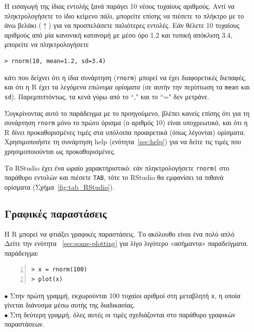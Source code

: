 \documentclass[a4paper,10pt,twocolumn]{article}
\makeatletter
\let\SF@@footnote\footnote
\def\footnote{\ifx\protect\@typeset@protect
 \expandafter\SF@@footnote
 \else
 \expandafter\SF@gobble@opt
 \fi
}
\edef\SF@gobble@opt{\noexpand\protect
 \expandafter\noexpand\csname SF@gobble@opt \endcsname}
\makeatother
\begin{document}
Η εισαγωγή της ίδιας εντολής ξανά παράγει 10 νέους τυχαίους αριθμούς. Αντί να πληκτρολογήσετε το ίδιο κείμενο 
πάλι, μπορείτε επίσης να πιέσετε το πλήκτρο με το άνω βελάκι ($\uparrow$) για να προσπελάσετε παλιότερες 
εντολές. Εάν θέλετε 10 τυχαίους αριθμούς από μία κανονική κατανομή με μέσο όρο 1.2 και τυπική απόκλιση 3.4,
μπορείτε να πληκτρολογήσετε

\begin{Verbatim}[frame=single,gobble=0]
> rnorm(10, mean=1.2, sd=3.4)
\end{Verbatim}

κάτι που δείχνει ότι η ίδια συνάρτηση (\texttt{rnorm}) μπορεί να έχει διαφορετικές διεπαφές, και ότι η R έχει
τα λεγόμενα \emph{επώνυμα ορίσματα}  (σε αυτήν την περίπτωση τα \texttt{mean} και \texttt{sd}). Παρεμπιπτόντως,
τα κενά γύρω από το ``," και το ``=" δεν μετράνε.

Συγκρίνοντας αυτό το παράδειγμα με το προηγούμενο, βλέπει κανείς επίσης ότι για τη συνάρτηση \texttt{rnorm}
μόνο το πρώτο όρισμα (ο αριθμός 10) είναι υποχρεωτικό, και ότι η R δίνει προκαθορισμένες τιμές στα υπόλοιπα
προαιρετικά (όπως λέγονται) ορίσματα.\footnote{Χρησιμοποιήστε τη συνάρτηση help (ενότητα~\ref{sec:help}) για να
δείτε τις τιμές που χρησιμοποιούνται ως προκαθορισμένες.} 

Το RStudio έχει ένα ωραίο χαρακτηριστικό: εάν πληκτρολογήσετε \verb!rnorm(! στο παράθυρο εντολών και πιέσετε
\texttt{TAB}, τότε το RStudio θα εμφανίσει τα πιθανά ορίσματα (Σχήμα~\ref{fig:tab_RStudio}).

\subsection{Γραφικές παραστάσεις}

Η R μπορεί να φτιάξει γραφικές παραστάσεις. Το ακόλουθο είναι ένα πολύ απλό\footnote{Δείτε την ενότητα
~\ref{sec:some-plotting} για λίγο λιγότερο «ασήμαντα» παραδείγματα.} παράδειγμα:

\begin{Verbatim}[frame=single,numbers=left,gobble=0, xleftmargin=0.35cm, numbersep=0.1cm]
> x = rnorm(100)
> plot(x)
\end{Verbatim}

\noindent $\bullet$ Στην πρώτη γραμμή, εκχωρούνται 100 τυχαίοι αριθμοί στη μεταβλητή \texttt{x}, η οποία
γίνεται διάνυσμα μέσω αυτής της διαδικασίας. \\
\noindent $\bullet$ Στη δεύτερη γραμμή, όλες αυτές οι τιμές σχεδιάζονται στο παράθυρο γραφικών παραστάσεων.\\
\end{document}
